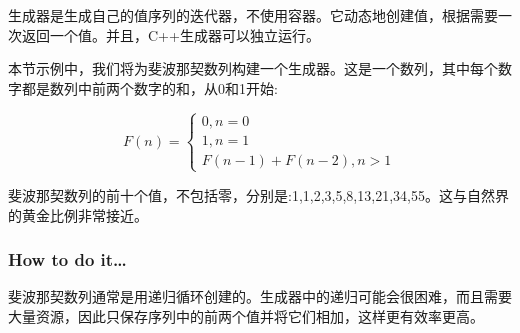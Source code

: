 
生成器是生成自己的值序列的迭代器，不使用容器。它动态地创建值，根据需要一次返回一个值。并且，C++生成器可以独立运行。

本节示例中，我们将为斐波那契数列构建一个生成器。这是一个数列，其中每个数字都是数列中前两个数字的和，从0和1开始:

\begin{equation*}
F(n)=
\begin{cases}
	0, n = 0 \\
	1, n = 1 \\
	F(n-1) + F(n-2), n > 1
\end{cases}
\end{equation*}

斐波那契数列的前十个值，不包括零，分别是:1,1,2,3,5,8,13,21,34,55。这与自然界的黄金比例非常接近。

\subsubsection{How to do it…}

斐波那契数列通常是用递归循环创建的。生成器中的递归可能会很困难，而且需要大量资源，因此只保存序列中的前两个值并将它们相加，这样更有效率更高。

